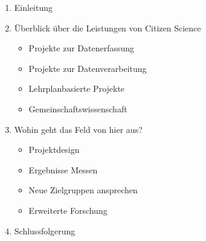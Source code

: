 \documentclass{article}
\begin{document}
\begin{enumerate}
\item Einleitung


\item Überblick über die Leistungen von Citizen Science

\begin{itemize}
\item Projekte zur Datenerfassung


\item Projekte zur Datenverarbeitung


\item Lehrplanbasierte Projekte


\item Gemeinschaftswissenschaft


\end{itemize}

\item Wohin geht das Feld von hier aus?

\begin{itemize}
\item Projektdesign


\item Ergebnisse Messen


\item Neue Zielgruppen ansprechen


\item Erweiterte Forschung


\end{itemize}

\item Schlussfolgerung


\end{enumerate}

\printbibliography[title={Literaturverzeichnis}]
\end{document}
